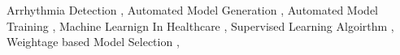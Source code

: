 \documentclass[a4paper,fleqn]{cas-dc}
\begin{document}
\begin{keywords}
    Arrhythmia Detection \sep
    Automated Model Generation \sep
    Automated Model Training \sep
    Machine Learnign In Healthcare \sep
    Supervised Learning Algoirthm \sep
    Weightage based Model Selection \sep
\end{keywords}

\maketitle














\end{document}
